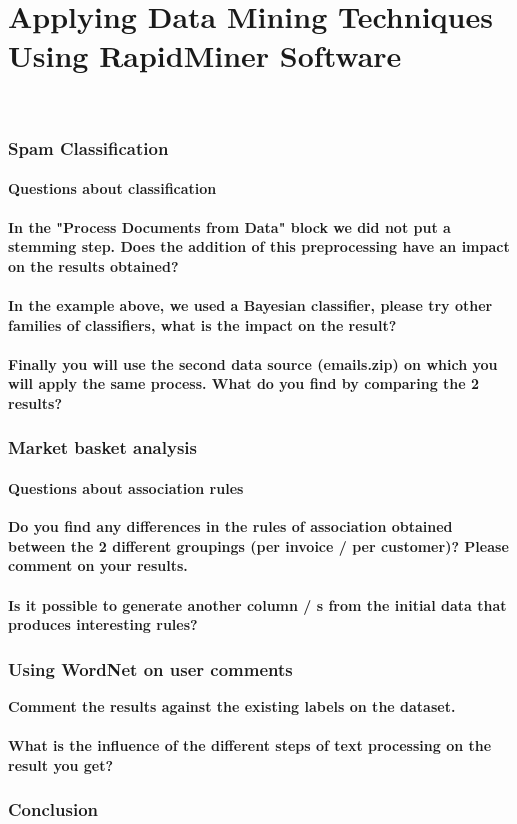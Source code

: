 \documentclass[a4paper]{article}
\begin{document}
\part*{Applying Data Mining Techniques Using RapidMiner Software}
 \\

\section{Spam Classification}

\subsection{Questions about classification}
\textbf{In the "Process Documents from Data" block we did not put a stemming step. Does the addition of this preprocessing have an impact on the results obtained?}
\\\\
\textbf{In the example above, we used a Bayesian classifier, please try other families of classifiers, what is the impact on the result?}
\\\\
\textbf{Finally you will use the second data source (emails.zip) on which you will apply the same process. What do you find by comparing the 2 results?}


\section{Market basket analysis}
\subsection{Questions about association rules}
\textbf{Do you find any differences in the rules of association obtained between the 2 different groupings (per invoice / per customer)? Please comment on your results.}
\\\\
\textbf{Is it possible to generate another column / s from the initial data that produces interesting rules?}

\section{Using WordNet on user comments}

\textbf{Comment the results against the existing labels on the dataset.}
\\\\
\textbf{What is the influence of the different steps of text processing on the result you get?}

\section{Conclusion}
\end{document}
